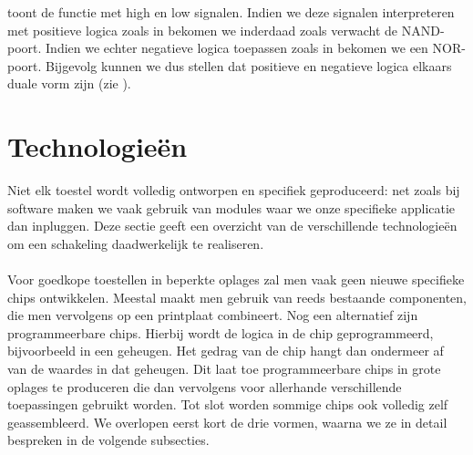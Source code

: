 \begin{table}[hbt]
\centering
{}
\caption{Verschil tussen positieve en negatieve logica.}
\end{table}

toont de functie met high en low signalen. Indien we deze signalen interpreteren met positieve logica zoals in  bekomen we inderdaad zoals verwacht de NAND-poort. Indien we echter negatieve logica toepassen zoals in  bekomen we een NOR-poort. Bijgevolg kunnen we dus stellen dat positieve en negatieve logica elkaars duale vorm zijn (zie ).

\section{Technologie\"en}
Niet elk toestel wordt volledig ontworpen en specifiek geproduceerd: net zoals bij software maken we vaak gebruik van modules waar we onze specifieke applicatie dan inpluggen. Deze sectie geeft een overzicht van de verschillende technologie\"en om een schakeling daadwerkelijk te realiseren.

\paragraph{}
Voor goedkope toestellen in beperkte oplages zal men vaak geen nieuwe specifieke chips ontwikkelen. Meestal maakt men gebruik van reeds bestaande componenten, die men vervolgens op een printplaat combineert. Nog een alternatief zijn programmeerbare chips. Hierbij wordt de logica in de chip geprogrammeerd, bijvoorbeeld in een geheugen. Het gedrag van de chip hangt dan ondermeer af van de waardes in dat geheugen. Dit laat toe programmeerbare chips in grote oplages te produceren die dan vervolgens voor allerhande verschillende toepassingen gebruikt worden. Tot slot worden sommige chips ook volledig zelf geassembleerd. We overlopen eerst kort de drie vormen, waarna we ze in detail bespreken in de volgende subsecties.

